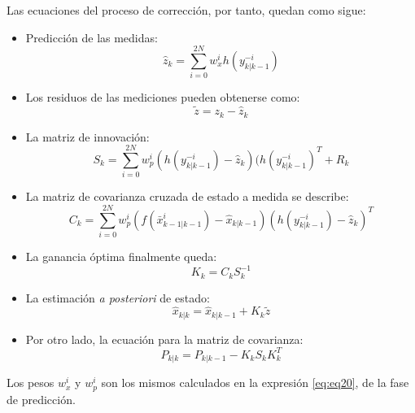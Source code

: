\begin{enumerate}
Las ecuaciones del proceso de correcci\'on, por tanto, quedan como sigue:
\begin{itemize}
\item Predicci\'on de las medidas:\\
\begin{equation}
\label{eq:eq25}
\hat{z}_{k} = \sum_{i=0}^{2N} w_x^i h(y_{k|k-1}^{-i})
\end{equation}
\item Los residuos de las mediciones pueden obtenerse como:\\
\begin{equation}
\tilde{z} = z_k - \hat{z}_k
\label{eq:eq26}
\end{equation}
\item La matriz de innovaci\'on:\\
\begin{equation}
S_k = \sum_{i=0}^{2N} w_p^i (h(y_{k|k-1}^{-i}) - \hat{z}_k)(h(y_{k|k-1}^{-i})^T + R_k 
\label{eq:eq27}
\end{equation}
\item La matriz de covarianza cruzada de estado a medida se describe:\\
\begin{equation}
C_k = \sum_{i=0}^{2N} w_p^i ( f(\bar{x}^i_{k-1 | k-1})- \hat{x}_{k|k-1} )( h(y_{k|k-1}^{-i}) - \hat{z}_k )^T
\label{eq:eq28}
\end{equation}
\item La ganancia \'optima finalmente queda:\\
\begin{equation}
K_k = C_kS_k^{-1}
\label{eq:eq29}
\end{equation}
\item La estimaci\'on \textit{a posteriori} de estado:\\
\begin{equation}
\label{eq:eq30}
 \hat{x}_{k|k} =  \hat{x}_{k|k-1} + K_k \tilde{z}
\end{equation}
\item Por otro lado, la ecuaci\'on para la matriz de covarianza:\\
\begin{equation}
\label{eq:eq31}
P_{k|k} = P_{k|k-1} - K_kS_kK_k^T
\end{equation}
\end{itemize}
Los pesos $w_x^i$ y $w_p^i$ son los mismos calculados en la expresi\'on \ref{eq:eq20}, de la fase de predicci\'on.
\end{enumerate}

